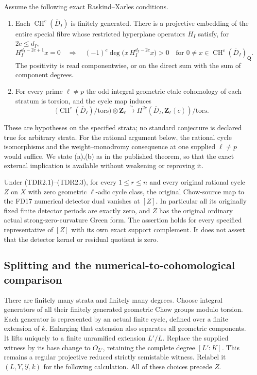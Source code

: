 Assume the following exact Raskind--Xarles conditions.
\begin{enumerate}
\item[(a)] Each $\operatorname{CH}^c(\overline D_I)$ is finitely generated.
There is a projective embedding of the entire special fibre whose
restricted hyperplane operators $H_I$ satisfy, for $2c\leq d_I$,
\[
 H_I^{d_I-2c+1}x=0\quad\Longrightarrow\quad
 (-1)^c\deg\bigl(x\,H_I^{d_I-2c}x\bigr)>0
 \quad\text{for }0\ne x\in\operatorname{CH}^c(\overline D_I)_{\mathbf Q}.
 \tag{TDR2.2}
\]
The positivity is read componentwise, or on the direct sum with the
sum of component degrees.
\item[(b)] For every prime $\ell\ne p$ the odd integral geometric
etale cohomology of each stratum is torsion, and the cycle map induces
\[
 \bigl(\operatorname{CH}^c(\overline D_I)/\mathrm{tors}\bigr)
       \otimes\mathbf Z_\ell
 \xrightarrow{\ \sim\ }
 H^{2c}(\overline D_I,\mathbf Z_\ell(c))/\mathrm{tors}.
 \tag{TDR2.3}
\]
\end{enumerate}
These are hypotheses on the specified strata; no standard conjecture
is declared true for arbitrary strata. For the rational argument below,
the rational cycle isomorphisms and the weight--monodromy consequence
at one supplied $\ell\ne p$ would suffice. We state (a),(b) as in the
published theorem, so that the exact external implication is available
without weakening or reproving it.

\begin{theorem}
\label{sc2td:main}
Under (TDR2.1)--(TDR2.3), for every $1\leq r\leq n$ and every original
rational cycle $Z$ on $X$ with zero geometric $\ell$-adic cycle class,
the original Chow-source map to the FD17 numerical detector dual
vanishes at $[Z]$. In particular all its originally fixed finite
detector periods are exactly zero, and $Z$ has the original ordinary
actual strong-zero-curvature Green form. The assertion holds for every
specified representative of $[Z]$ with its own exact support complement.
It does not assert that the detector kernel or residual quotient is zero.
\end{theorem}

\subsection{Splitting and the numerical-to-cohomological comparison}

There are finitely many strata and finitely many degrees. Choose integral
generators of all their finitely generated geometric Chow groups modulo
torsion. Each generator is represented by an actual finite cycle, defined
over a finite extension of $k$. Enlarging that extension also separates
all geometric components. It lifts uniquely to a finite unramified
extension $L'/L$. Replace the supplied witness by its base change to
$O_{L'}$, retaining the complete degree $[L':K]$.
This remains a regular projective reduced strictly semistable witness.
Relabel it $(L,Y,\mathcal Y,k)$ for the following calculation. All of
these choices precede $Z$.

